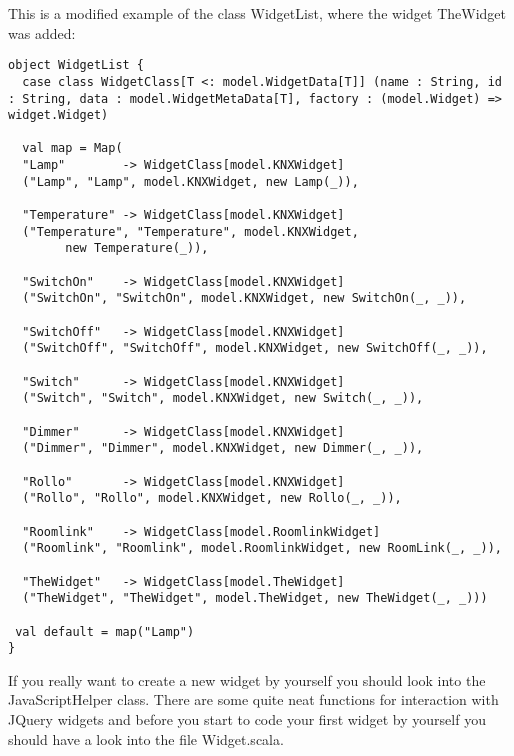 This is a modified example of the class WidgetList, where the widget TheWidget was added:
\begin{lstlisting}[caption=widget list ,label=lst:h2h:widgetlist]
object WidgetList {
  case class WidgetClass[T <: model.WidgetData[T]] (name : String, id : String, data : model.WidgetMetaData[T], factory : (model.Widget) => widget.Widget)

  val map = Map(
  "Lamp"        -> WidgetClass[model.KNXWidget]
  ("Lamp", "Lamp", model.KNXWidget, new Lamp(_)),

  "Temperature" -> WidgetClass[model.KNXWidget]
  ("Temperature", "Temperature", model.KNXWidget,
        new Temperature(_)),

  "SwitchOn"    -> WidgetClass[model.KNXWidget]
  ("SwitchOn", "SwitchOn", model.KNXWidget, new SwitchOn(_, _)),

  "SwitchOff"   -> WidgetClass[model.KNXWidget]
  ("SwitchOff", "SwitchOff", model.KNXWidget, new SwitchOff(_, _)),

  "Switch"      -> WidgetClass[model.KNXWidget]
  ("Switch", "Switch", model.KNXWidget, new Switch(_, _)),

  "Dimmer"      -> WidgetClass[model.KNXWidget]
  ("Dimmer", "Dimmer", model.KNXWidget, new Dimmer(_, _)),

  "Rollo"       -> WidgetClass[model.KNXWidget]
  ("Rollo", "Rollo", model.KNXWidget, new Rollo(_, _)),

  "Roomlink"    -> WidgetClass[model.RoomlinkWidget]
  ("Roomlink", "Roomlink", model.RoomlinkWidget, new RoomLink(_, _)),

  "TheWidget"   -> WidgetClass[model.TheWidget]
  ("TheWidget", "TheWidget", model.TheWidget, new TheWidget(_, _)))

 val default = map("Lamp")
}
\end{lstlisting}

If you really want to create a new widget by yourself you should look into the JavaScriptHelper class. There are some quite neat functions for interaction with JQuery widgets and before you start to code your first widget by yourself you should have a look into the file Widget.scala.